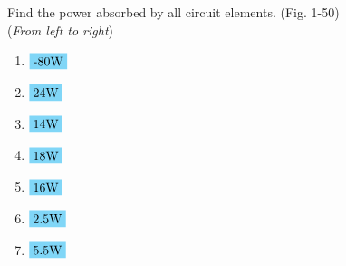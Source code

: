 Find the power absorbed by all circuit elements. (Fig. 1-50) \\
(\emph{From left to right})
\begin{enumerate}[leftmargin=2cm,labelsep=.5cm,label=\bfseries\alph*)]
	\item $
	\begin{aligned}[t]
	\hlbox{-80\qw{\W}}
	\end{aligned} $
	\\[1cm]
	
	\item $
	\begin{aligned}[t]
	\hlbox{24\qw{\W}}
	\end{aligned} $
	\\[1cm]
	
	\item $
	\begin{aligned}[t]
	\hlbox{14\qw{\W}}
	\end{aligned} $
	\\[1cm]
	
	\item $
	\begin{aligned}[t]
	\hlbox{18\qw{\W}}
	\end{aligned} $
	\\[1cm]
	
	\item $
	\begin{aligned}[t]
	\hlbox{16\qw{\W}}
	\end{aligned} $
	\\[1cm]
	
	\item $
	\begin{aligned}[t]
	\hlbox{2.5\qw{\W}}
	\end{aligned} $
	\\[1cm]
	
	\item $
	\begin{aligned}[t]
	\hlbox{5.5\qw{\W}}
	\end{aligned} $
	\\[1cm]
\end{enumerate}
